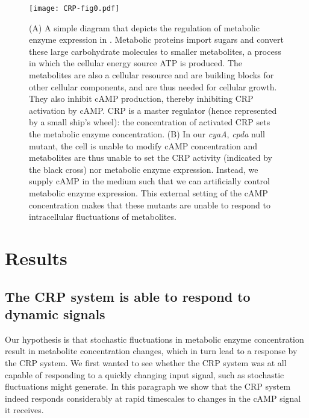 \begin{figure}
	\centering
	\texttt{[image: CRP-fig0.pdf]}
	\caption{ 
		(A) A simple diagram that depicts the regulation of metabolic enzyme expression in \ecoli. Metabolic proteins import sugars and convert these large carbohydrate molecules to smaller metabolites, a process in which the cellular energy source ATP is produced. The metabolites are also a cellular resource and are building blocks for other cellular components, and are thus needed for cellular growth. They also inhibit cAMP production, thereby inhibiting CRP activation by cAMP. CRP is a master regulator (hence represented by a small ship's wheel): the concentration of activated CRP sets the metabolic enzyme concentration.
        (B) In our \textit{cyaA}, \textit{cpda} null mutant, the cell is unable to modify cAMP concentration and
        metabolites are thus unable to set the CRP activity (indicated by the black cross) nor metabolic enzyme expression. 
        Instead, we supply cAMP in the medium such that we can artificially control metabolic enzyme expression. 
        This external setting of the cAMP concentration makes that these mutants are unable to respond to intracellular fluctuations of metabolites.
	}
	\label{fig:CRP:fig0}
\end{figure}


%
% 

\section*{Results}

\subsection*{The CRP system is able to respond to dynamic signals}

Our hypothesis is that stochastic fluctuations in metabolic enzyme concentration result in metabolite concentration changes, which in turn lead to a response by the CRP system.
%
We first wanted to see whether the CRP system was at all capable of responding to a quickly changing input signal, such as stochastic fluctuations might generate.
%
%
In this paragraph we show that the CRP system indeed responds considerably at rapid timescales to changes in the cAMP signal it receives.


